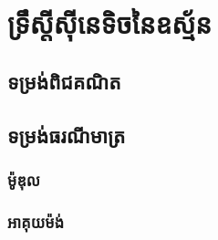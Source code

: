 \documentclass[a5paper,10pt]{booki}
\begin{document}
	\chapter{ទ្រឹស្តីសុីនេទិចនៃឧស្ម័ន}
	\section{ទម្រង់ពិជគណិត}
	\section{ទម្រង់ធរណីមាត្រ}
	\subsection{ម៉ូឌុល}
	\subsection{អាគុយម៉ង់}
\end{document}
